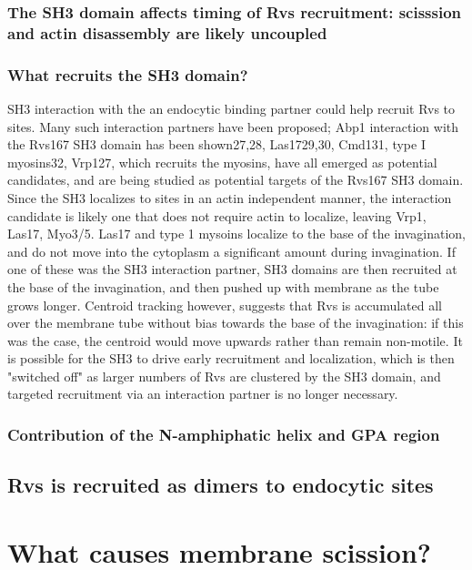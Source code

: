 \subsubsection{The SH3 domain affects timing of Rvs recruitment: scisssion and actin disassembly are likely uncoupled}


\subsubsection{What recruits the SH3 domain?}
SH3 interaction with the an endocytic binding partner could help recruit Rvs to sites. Many such interaction partners have been proposed; Abp1 interaction with the Rvs167 SH3 domain has been shown27,28, Las1729,30, Cmd131, type I myosins32, Vrp127, which recruits the myosins, have all emerged as potential candidates, and are being studied as potential targets of the Rvs167 SH3 domain. Since the SH3 localizes to sites in an actin independent manner, the interaction candidate is likely one that does not require actin to localize, leaving Vrp1, Las17, Myo3/5. Las17 and type 1 mysoins localize to the base of the invagination, and do not move into the cytoplasm a significant amount during invagination. If one of these was the SH3 interaction partner, SH3 domains are then recruited at the base of the invagination, and then pushed up with membrane as the tube grows longer. Centroid tracking however, suggests that Rvs is accumulated all over the membrane tube without bias towards the base of the invagination: if this was the case, the centroid would move upwards rather than remain non-motile. It is possible for the SH3 to drive early recruitment and localization, which is then "switched off" as larger numbers of Rvs are clustered by the SH3 domain, and targeted recruitment via an interaction partner is no longer necessary. 

\subsubsection{Contribution of the N-amphiphatic helix and GPA region}

\subsection{Rvs is recruited as dimers to endocytic sites}

\section{What causes membrane scission?}

